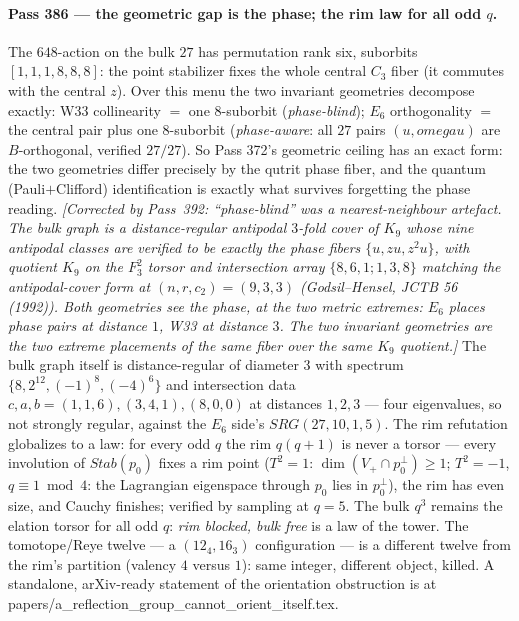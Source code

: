 \documentclass[12pt,a4paper]{article}
\def\mathbb#1{#1}%
\def\mathrm#1{#1}%
\def\textbf#1{#1}%
\def\texttt#1{#1}%
\def\omega{omega}%
\theoremstyle{definition}
\newcommand{\FF}{\mathbb{F}}
\begin{document}
\paragraph{Pass 386 --- the geometric gap is the phase; the rim law for all odd
$q$.}
The $648$-action on the bulk $27$ has permutation rank six, suborbits
$[1,1,1,8,8,8]$: the point stabilizer fixes the whole central $C_3$ fiber
(it commutes with the central $z$).  Over this menu the two invariant
geometries decompose exactly: W33 collinearity $=$ one $8$-suborbit
(\emph{phase-blind}); $E_6$ orthogonality $=$ the central pair plus one
$8$-suborbit (\emph{phase-aware}: all $27$ pairs $(u,\omega u)$ are
$B$-orthogonal, verified $27/27$).  So Pass 372's geometric ceiling has an
exact form: \textbf{the two geometries differ precisely by the qutrit phase
fiber}, and the quantum (Pauli$+$Clifford) identification is exactly what
survives forgetting the phase reading.
\emph{[Corrected by Pass~392: ``phase-blind'' was a nearest-neighbour
artefact.  The bulk graph is a distance-regular \textbf{antipodal $3$-fold
cover of $K_9$} whose nine antipodal classes are verified to be exactly the
phase fibers $\{u,zu,z^2u\}$, with quotient $K_9$ on the $\FF_3^2$ torsor and
intersection array $\{8,6,1;1,3,8\}$ matching the antipodal-cover form at
$(n,r,c_2)=(9,3,3)$ (Godsil--Hensel, JCTB \textbf{56} (1992)).  Both
geometries see the phase, at the two metric extremes: $E_6$ places phase pairs
at distance $1$, W33 at distance $3$.  The two invariant geometries are the
two extreme placements of the same fiber over the same $K_9$ quotient.]}  The bulk graph itself is
distance-regular of diameter $3$ with spectrum $\{8,2^{12},(-1)^8,(-4)^6\}$
and intersection data $c,a,b = (1,1,6),(3,4,1),(8,0,0)$ at distances $1,2,3$
--- four eigenvalues, so not strongly regular, against the $E_6$ side's
$\mathrm{SRG}(27,10,1,5)$.  The rim refutation globalizes to a law:
\textbf{for every odd $q$ the rim $q(q{+}1)$ is never a torsor} --- every
involution of $\mathrm{Stab}(p_0)$ fixes a rim point ($T^2{=}1$: $\dim(V_+\cap
p_0^\perp)\ge1$; $T^2{=}-1$, $q\equiv1\bmod4$: the Lagrangian eigenspace
through $p_0$ lies in $p_0^\perp$), the rim has even size, and Cauchy
finishes; verified by sampling at $q=5$.  The bulk $q^3$ remains the elation
torsor for all odd $q$: \emph{rim blocked, bulk free} is a law of the tower.
The tomotope/Reye twelve --- a $(12_4,16_3)$ configuration --- is a different
twelve from the rim's partition (valency $4$ versus $1$): same integer,
different object, killed.  A standalone, arXiv-ready statement of the
orientation obstruction is at
\texttt{papers/a\_reflection\_group\_cannot\_orient\_itself.tex}.
\end{document}
